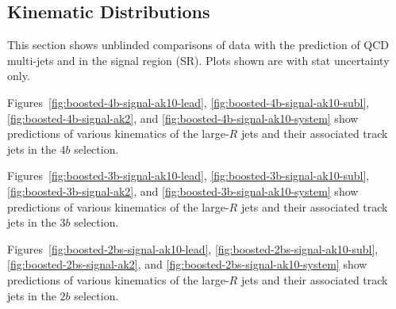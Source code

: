 \clearpage
\subsection{Kinematic Distributions}

This section shows unblinded comparisons of data with the prediction of QCD multi-jets and \ttbar in the signal region (SR). Plots shown are with stat uncertainty only.

Figures~\ref{fig:boosted-4b-signal-ak10-lead}, \ref{fig:boosted-4b-signal-ak10-subl}, \ref{fig:boosted-4b-signal-ak2}, and \ref{fig:boosted-4b-signal-ak10-system} show predictions of various kinematics of the large-$R$ jets and their associated track jets in the $4b$ selection.

Figures~\ref{fig:boosted-3b-signal-ak10-lead}, \ref{fig:boosted-3b-signal-ak10-subl}, \ref{fig:boosted-3b-signal-ak2}, and \ref{fig:boosted-3b-signal-ak10-system} show predictions of various kinematics of the large-$R$ jets and their associated track jets in the $3b$ selection.

Figures~\ref{fig:boosted-2bs-signal-ak10-lead}, \ref{fig:boosted-2bs-signal-ak10-subl}, \ref{fig:boosted-2bs-signal-ak2}, and \ref{fig:boosted-2bs-signal-ak10-system} show predictions of various kinematics of the large-$R$ jets and their associated track jets in the $2b$ selection.

